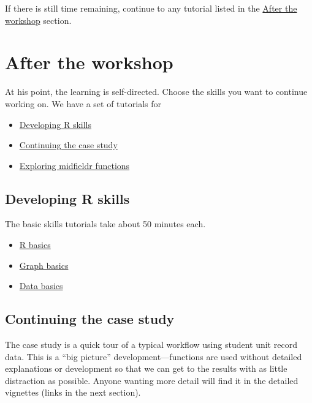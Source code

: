 \documentclass[
]{book}
\providecommand{\tightlist}{%
  \setlength{\itemsep}{0pt}\setlength{\parskip}{0pt}}
\begin{document}
If there is still time remaining, continue to any tutorial listed in the \protect\hyperlink{after-the-workshop}{After the workshop} section.

\hypertarget{after-the-workshop}{%
\section{After the workshop}\label{after-the-workshop}}

At his point, the learning is self-directed. Choose the skills you want to continue working on. We have a set of tutorials for

\begin{itemize}
\tightlist
\item
  \protect\hyperlink{developing-r-skills}{Developing R skills}
\item
  \protect\hyperlink{continuing-the-case-study}{Continuing the case study}
\item
  \protect\hyperlink{exploring-midfieldr-functions}{Exploring midfieldr functions}
\end{itemize}

\hypertarget{developing-r-skills}{%
\subsection{Developing R skills}\label{developing-r-skills}}

The basic skills tutorials take about 50 minutes each.

\begin{itemize}
\tightlist
\item
  \protect\hyperlink{r-basics}{R basics}
\item
  \protect\hyperlink{graph-basics}{Graph basics}\\
\item
  \protect\hyperlink{data-basics}{Data basics}
\end{itemize}

\hypertarget{continuing-the-case-study}{%
\subsection{Continuing the case study}\label{continuing-the-case-study}}

The case study is a quick tour of a typical workflow using student unit record data. This is a ``big picture'' development---functions are used without detailed explanations or development so that we can get to the results with as little distraction as possible. Anyone wanting more detail will find it in the detailed vignettes (links in the next section).
\end{document}
